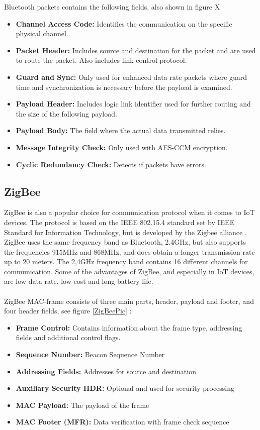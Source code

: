 Bluetooth packets contains the following fields, also shown in figure X

\begin{itemize}
    \item \textbf{Channel Access Code:} Identifies the communication on the specific physical channel. 
    \item \textbf{Packet Header:} Includes source and destination for the packet and are used to route the packet. Also includes link control protocol. 
    \item \textbf{Guard and Sync:} Only used for enhanced data rate packets where guard time and synchronization is necessary before the payload is examined.
    \item \textbf{Payload Header:} Includes logic link identifier used for further routing and the size of the following payload.
    \item \textbf{Payload Body:} The field where the actual data transmitted relies. 
    \item \textbf{Message Integrity Check:} Only used with AES-CCM encryption.
    \item \textbf{Cyclic Redundancy Check:} Detects if packets have errors. 
\end{itemize}


\subsection{ZigBee}
ZigBee is also a popular choice for communication protocol when it comes to IoT devices. The protocol is based on the IEEE 802.15.4 standard set by IEEE Standard for Information Technology, but is developed by the Zigbee alliance \cite{ZigBeeStandard} \cite{ZigbeeAlliance}. ZigBee uses the same frequency band as Bluetooth, 2.4GHz, but also supports the frequencies 915MHz and 868MHz, and does obtain a longer transmission rate up to 20 meters. \cite{IAQMonitorCommunicationReview} The 2,4GHz frequency band contains 16 different channels for communication. \cite{ZigbeeOverview} Some of the advantages of ZigBee, and especially in IoT devices, are low data rate, low cost and long battery life. 
\\\\
ZigBee MAC-frame consists of three main parts, header, payload and footer, and four header fields, see figure \ref{ZigBeePic} \cite{ZigBeBasics}:
\begin{itemize}
    \item \textbf{Frame Control:} Contains information about the frame type, addressing fields and additional control flags.
    \item \textbf{Sequence Number:} Beacon Sequence Number
    \item \textbf{Addressing Fields:} Addresses for source and destination
    \item \textbf{Auxiliary Security HDR:} Optional and used for security processing
    \item \textbf{MAC Payload:}  The payload of the frame
    \item \textbf{MAC Footer (MFR):} Data verification with frame check sequence
\end{itemize}

